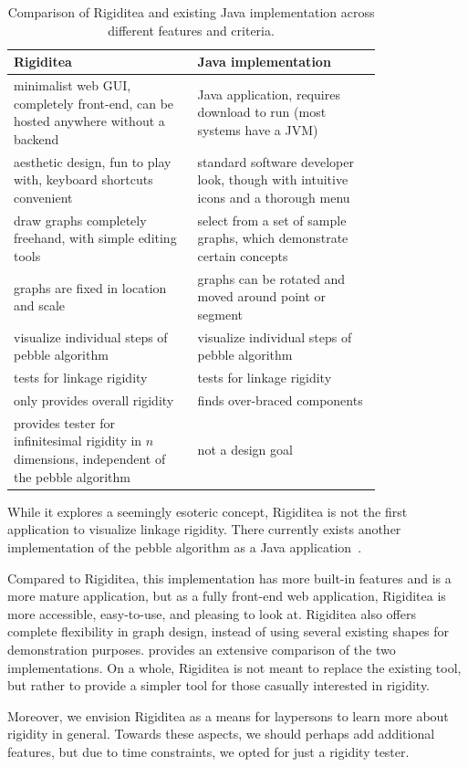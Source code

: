 \documentclass[aps,prd,final,twocolumn,letterpaper,nofootinbib]{revtex4-1}
\begin{document}
\begin{table}[ht]
\def\arraystretch{1.5}
\caption{Comparison of Rigiditea and existing Java implementation
across different features and criteria.}
\begin{tabular}{p{0.4\linewidth} | p{0.4\linewidth}}
Rigiditea & Java implementation \\ \hline
minimalist web GUI, completely front-end, can be hosted anywhere
without a backend &
Java application, requires download to run (most systems have a JVM) \\
aesthetic design, fun to play with, keyboard shortcuts convenient &
standard software developer look, though with intuitive icons
and a thorough menu\\
draw graphs completely freehand,
with simple editing tools &
select from a set of sample graphs,
which demonstrate certain concepts \\
graphs are fixed in location and scale &
graphs can be rotated and moved around point or segment \\
visualize individual steps of pebble algorithm &
visualize individual steps of pebble algorithm\\
tests for linkage rigidity & tests for linkage rigidity\\
only provides overall rigidity & finds over-braced components \\
provides tester for infinitesimal rigidity in $n$ dimensions,
independent of the pebble algorithm
& not a design goal
\end{tabular}
\label{tab:comp}
\end{table}

While it explores a seemingly esoteric concept,
Rigiditea is not the first application to visualize linkage rigidity.
There currently exists another
implementation of the pebble algorithm as a Java application~\cite{stjohnapplet}.

Compared to Rigiditea, this implementation
has more built-in features and is a more mature application,
but as a fully front-end web application,
Rigiditea is more accessible, easy-to-use, and pleasing to look at.
Rigiditea also offers complete flexibility in graph design,
instead of using several existing shapes for demonstration purposes.
 provides an extensive comparison of the two implementations.
On a whole, Rigiditea is not meant to replace the existing tool,
but rather to provide a simpler tool for those casually interested
in rigidity.

Moreover, we envision Rigiditea as a means for laypersons
to learn more about rigidity in general.
Towards these aspects, we should perhaps add additional features,
but due to time constraints, we opted for just a rigidity tester.
\end{document}
